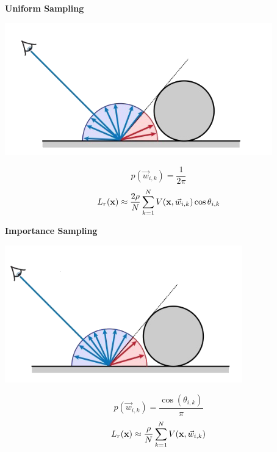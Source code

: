 \documentclass{article}
\begin{document}
\begin{minipage}{0.435\textwidth}
    {
        \centering

        \textbf{Uniform Sampling\phantom{aaaaaaaa}}

        \includegraphics[width=0.95\linewidth]{images/uniform_ambient_occlusion_1.png}
    }
    \[
        p(\vec{w}_{i,k}) = \frac{1}{2\pi}
    \]
    \[
        L_r(\text{\textbf{x}}) \approx \frac{2\rho}{N} \sum_{k=1}^N V(\text{\textbf{x}}, \vec{w}_{i,k}) \cos \theta_{i,k}
    \]
\end{minipage}
\begin{minipage}{0.435\textwidth}
    {
        \centering

        \textbf{Importance Sampling\phantom{aaaa}}
        
        \vspace{-8px}

        \includegraphics[width=0.9\linewidth]{images/importance_ambient_occlusion_1.png}
    }
    \[
        p(\vec{w}_{i,k}) = \frac{\cos(\theta_{i,k})}{\pi}
    \]
    \[
        L_r(\text{\textbf{x}}) \approx \frac{\rho}{N} \sum_{k=1}^N V(\text{\textbf{x}}, \vec{w}_{i,k})
    \]
\end{minipage}


\newpage
\end{document}
